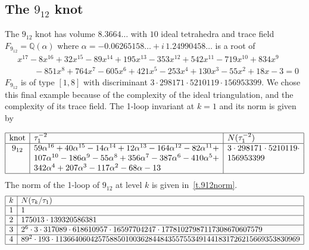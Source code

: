 \documentclass[12pt]{amsart}
\theoremstyle{definition}
\def\BQ{\mathbb Q}
\def\a{\alpha}
\def\be{  \begin{equation} }
\def\ee{  \end{equation} }
\begin{document}
\subsection{The $9_{12}$ knot}
\label{sub.912}

The $9_{12}$ knot has volume $8.3664\dots$ with $10$ ideal tetrahedra and trace
field $F_{9_12}=\BQ(\a)$ where 
$\a=-0.06265158\dots + i \,1.24990458\dots$ is a root of 
\begin{align*}
&x^{17} - 8 x^{16} + 32 x^{15} - 89 x^{14} + 195 x^{13} - 353 x^{12} + 542 x^{11} - 
719 x^{10} + 834 x^9  \\
& \qquad - 851 x^8 + 764 x^7 - 605 x^6+ 421 x^5 - 
253 x^4 + 130 x^3 - 55 x^2 + 18 x - 3=0
\end{align*}
$F_{9_{12}}$ is of type $[1,8]$ with discriminant $3 \cdot 298171 \cdot 5210119
\cdot 156953399$. We chose this final example because of the complexity of
the ideal triangulation, and the complexity of its trace field.
The 1-loop invariant at $k=1$ and its norm is given by

\be
\label{eq.1loop912}
\begin{array}{|c|l|l|} \hline
\text{knot} & \tau_1^{-2} & N(\tau_1^{-2}) \\ \hline
9_{12} &  59 \a^{16} + 40 \a^{15} - 14 \a^{14} + 12 \a^{13} - 164 \a^{12}
- 82 \a^{11} + & 
 3 \cdot 298171 \cdot 5210119 \cdot %
 \\ &
107 \a^{10} - 186 \a^9 - 55 \a^8 + 356 \a^7 - 387 \a^6 
- 410 \a^5 + & 156953399 \\ & 342 \a^4 + 207 \a^3 - 117 \a^2 - 68 \a - 13 &
\\ \hline
\end{array} 
\ee
The norm of the 1-loop of $9_{12}$ at level $k$ is given in~\eqref{t.912norm}.
{\tiny
\be
\label{t.912norm}
\begin{array}{|c|l|} \hline
k & N(\tau_k/\tau_1) \\ \hline
1 & 1 \\ \hline
2 & 175013 \cdot 139320586381  \\ \hline
3 & 2^6 \cdot 3 \cdot 317089 \cdot 618610957 \cdot 16597704247 
\cdot 17781027987117308670607579
\\ \hline
4 & 89^2 \cdot 193 \cdot 
    113664060425758850100362844843557553491441831726215669353830969 
\\ \hline
\end{array}
\ee
}
\end{document}
